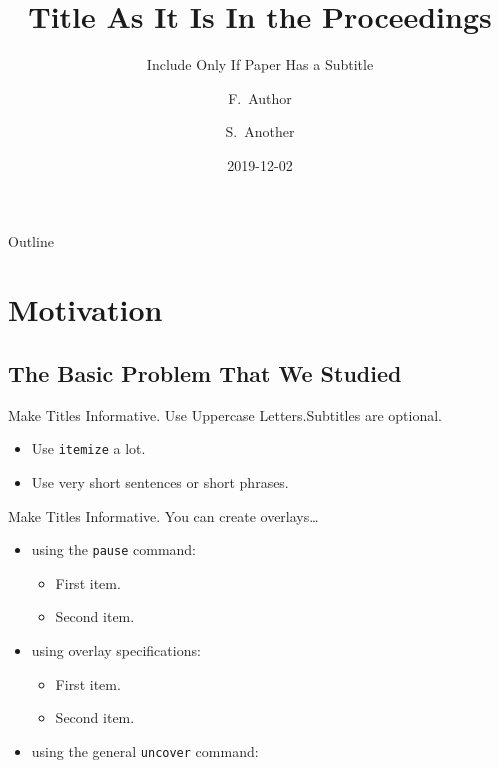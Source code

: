 \documentclass{beamer}
\title[Short Paper Title]
{Title As It Is In the Proceedings}
\subtitle
{Include Only If Paper Has a Subtitle}
\author[Author, Another] %
{F.~Author\inst{1} \and S.~Another\inst{2}}
\institute[Universities of Somewhere and Elsewhere] %
{
  \inst{1}%
  University of Somewhere
  \qquad
  \inst{2}%
  University of Elsewhere}
\date[CFP 2003] %
{2019-12-02}
\begin{document}
\frame[plain, t]{\titlepage}

\begin{frame}{Outline}
  \tableofcontents
\end{frame}

\section{Motivation}

\subsection{The Basic Problem That We Studied}

\begin{frame}{Make Titles Informative. Use Uppercase Letters.}{Subtitles are optional.}
  \begin{itemize}
  \item
    Use \texttt{itemize} a lot.
  \item
    Use very short sentences or short phrases.
  \end{itemize}
\end{frame}

\begin{frame}{Make Titles Informative.}
  You can create overlays\dots
  \begin{itemize}
  \item using the \texttt{pause} command:
    \begin{itemize}
    \item
      First item.
      \pause
    \item
      Second item.
    \end{itemize}
  \item
    using overlay specifications:
    \begin{itemize}
    \item<3->
      First item.
    \item<4->
      Second item.
    \end{itemize}
  \item
    using the general \texttt{uncover} command:
    \begin{itemize}
    \end{itemize}
  \end{itemize}
\end{frame}
\end{document}
